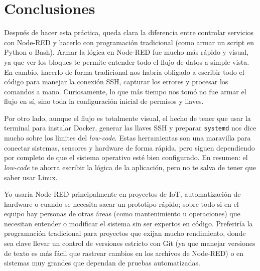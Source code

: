 \documentclass[12pt, letterpaper]{article}
\begin{document}
\section*{\centering \fontsize{14}{17}\sffamily\selectfont Conclusiones}

Después de hacer esta práctica, queda clara la diferencia entre controlar servicios con Node-RED y hacerlo con programación tradicional (como armar un script en Python o Bash). Armar la lógica en Node-RED fue mucho más rápido y visual, ya que ver los bloques te permite entender todo el flujo de datos a simple vista. En cambio, hacerlo de forma tradicional nos habría obligado a escribir todo el código para manejar la conexión SSH, capturar los errores y procesar los comandos a mano. Curiosamente, lo que más tiempo nos tomó no fue armar el flujo en sí, sino toda la configuración inicial de permisos y llaves.

Por otro lado, aunque el flujo es totalmente visual, el hecho de tener que usar la terminal para instalar Docker, generar las llaves SSH y preparar \texttt{systemd} nos dice mucho sobre los límites del \textit{low-code}. Estas herramientas son una maravilla para conectar sistemas, sensores y hardware de forma rápida, pero siguen dependiendo por completo de que el sistema operativo esté bien configurado. En resumen: el \textit{low-code} te ahorra escribir la lógica de la aplicación, pero no te salva de tener que saber usar Linux.

Yo usaría Node-RED principalmente en proyectos de IoT, automatización de hardware o cuando se necesita sacar un prototipo rápido; sobre todo si en el equipo hay personas de otras áreas (como mantenimiento u operaciones) que necesitan entender o modificar el sistema sin ser expertos en código. Preferiría la programación tradicional para proyectos que exijan mucho rendimiento, donde sea clave llevar un control de versiones estricto con Git (ya que manejar versiones de texto es más fácil que rastrear cambios en los archivos de Node-RED) o en sistemas muy grandes que dependan de pruebas automatizadas.

% 
\end{document}
